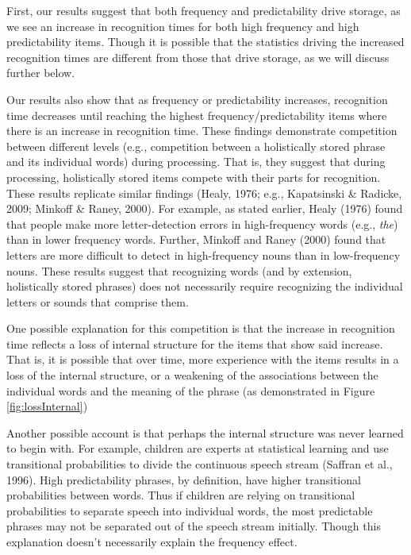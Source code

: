 \documentclass[
  man,floatsintext]{apa6}
\begin{document}
First, our results suggest that both frequency and predictability drive storage, as we see an increase in recognition times for both high frequency and high predictability items. Though it is possible that the statistics driving the increased recognition times are different from those that drive storage, as we will discuss further below.

Our results also show that as frequency or predictability increases, recognition time decreases until reaching the highest frequency/predictability items where there is an increase in recognition time. These findings demonstrate competition between different levels (e.g., competition between a holistically stored phrase and its individual words) during processing. That is, they suggest that during processing, holistically stored items compete with their parts for recognition. These results replicate similar findings (Healy, 1976; e.g., Kapatsinski \& Radicke, 2009; Minkoff \& Raney, 2000). For example, as stated earlier, Healy (1976) found that people make more letter-detection errors in high-frequency words (e.g., \emph{the}) than in lower frequency words. Further, Minkoff and Raney (2000) found that letters are more difficult to detect in high-frequency nouns than in low-frequency nouns. These results suggest that recognizing words (and by extension, holistically stored phrases) does not necessarily require recognizing the individual letters or sounds that comprise them.

One possible explanation for this competition is that the increase in recognition time reflects a loss of internal structure for the items that show said increase. That is, it is possible that over time, more experience with the items results in a loss of the internal structure, or a weakening of the associations between the individual words and the meaning of the phrase (as demonstrated in Figure \ref{fig:lossInternal})

Another possible account is that perhaps the internal structure was never learned to begin with. For example, children are experts at statistical learning and use transitional probabilities to divide the continuous speech stream (Saffran et al., 1996). High predictability phrases, by definition, have higher transitional probabilities between words. Thus if children are relying on transitional probabilities to separate speech into individual words, the most predictable phrases may not be separated out of the speech stream initially. Though this explanation doesn't necessarily explain the frequency effect.
\end{document}
